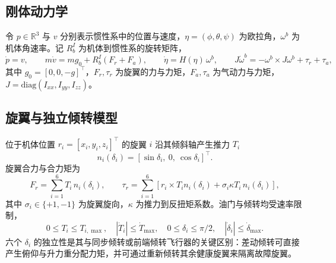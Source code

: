 \documentclass[UTF8,a4paper,11pt]{ctexart}
\begin{document}
\subsection{刚体动力学}\label{sec:rigid}
令 $p\in\mathbb{R}^3$ 与 $v$ 分别表示惯性系中的位置与速度，$\eta=(\phi,\theta,\psi)$ 为欧拉角，$\omega^b$ 为机体角速率。记 $R_b^I$ 为机体到惯性系的旋转矩阵，
\begin{equation}
\dot p = v,\qquad
m\dot v = mg_0 + R_b^I\!\left(F_r+F_a\right),\qquad
\dot\eta = H(\eta)\,\omega^b,\qquad
J\dot\omega^b = -\omega^b\times J\omega^b + \tau_r+\tau_a ,
\label{eq:rigid}
\end{equation}
其中 $g_0=[0,0,-g]^\top$，$F_r,\tau_r$ 为旋翼的力与力矩，$F_a,\tau_a$ 为气动力与力矩，$J=\mathrm{diag}(I_{xx},I_{yy},I_{zz})$。

\subsection{旋翼与独立倾转模型}\label{sec:rotor}
位于机体位置 $r_i=[x_i,y_i,z_i]^\top$ 的旋翼 $i$ 沿其倾斜轴产生推力 $T_i$
\begin{equation}
n_i(\delta_i)=[\sin\delta_i,\ 0,\ \cos\delta_i]^\top .
\label{eq:naxis}
\end{equation}
旋翼合力与合力矩为
\begin{equation}
F_r=\sum_{i=1}^{6} T_i\, n_i(\delta_i), \qquad
\tau_r=\sum_{i=1}^{6}\left[r_i\times T_i n_i(\delta_i)
   + \sigma_i \kappa T_i\, n_i(\delta_i)\right],
\label{eq:rotor}
\end{equation}
其中 $\sigma_i\in\{+1,-1\}$ 为旋翼旋向，$\kappa$ 为推力到反扭矩系数。油门与倾转均受速率限制，
\begin{equation}
0\le T_i\le T_{i,\max},\quad |\dot T_i|\le \dot T_{\max},\quad
0\le\delta_i\le\pi/2,\quad |\dot\delta_i|\le\dot\delta_{\max}.
\label{eq:actlim}
\end{equation}
六个 $\delta_i$ 的独立性是其与同步倾转或前端倾转飞行器的关键区别：差动倾转可直接产生俯仰与升力重分配力矩，并可通过重新倾转其余健康旋翼来隔离故障旋翼。
\end{document}
